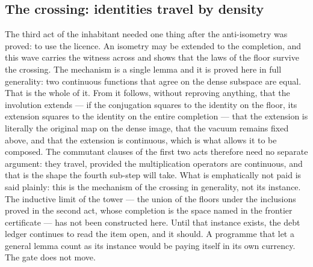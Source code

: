 \documentclass[11pt]{article}
\theoremstyle{definition}\newtheorem{deriv}{Derivation}
\begin{document}
\subsection*{The crossing: identities travel by density}The third act of the inhabitant needed one thing after the anti-isometry was proved: to use the licence. An isometry may be extended to the completion, and this wave carries the witness across and shows that the laws of the floor survive the crossing. The mechanism is a single lemma and it is proved here in full generality: two continuous functions that agree on the dense subspace are equal. That is the whole of it. From it follows, without reproving anything, that the involution extends --- if the conjugation squares to the identity on the floor, its extension squares to the identity on the entire completion --- that the extension is literally the original map on the dense image, that the vacuum remains fixed above, and that the extension is continuous, which is what allows it to be composed. The commutant clauses of the first two acts therefore need no separate argument: they travel, provided the multiplication operators are continuous, and that is the shape the fourth sub-step will take. What is emphatically not paid is said plainly: this is the mechanism of the crossing in generality, not its instance. The inductive limit of the tower --- the union of the floors under the inclusions proved in the second act, whose completion is the space named in the frontier certificate --- has not been constructed here. Until that instance exists, the debt ledger continues to read the item open, and it should. A programme that let a general lemma count as its instance would be paying itself in its own currency. The gate does not move.
\end{document}
